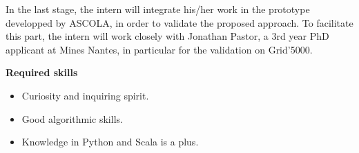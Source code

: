 \documentclass{letter}
\begin{document}
\begin{letter}
 In the last stage, the intern will integrate his/her work in the
 prototype developped by ASCOLA, in order to validate the proposed
approach. To facilitate this part, the intern will work closely with Jonathan
Pastor, a 3rd year PhD applicant at Mines Nantes, in particular for the validation on Grid'5000.

{\Large \textbf{Required skills}}

\begin{itemize}
\item Curiosity and inquiring spirit.
\item Good algorithmic skills.
\item Knowledge in Python and Scala is a plus.
\end{itemize}

\end{letter}
\end{document}

